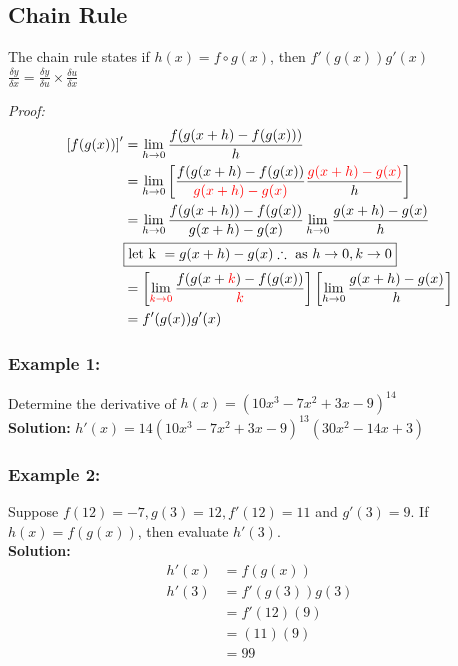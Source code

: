 \documentclass{article}
\begin{document}
\subsection{Chain Rule}
\begin{tcolorbox}[colback=OliveGreen!5!snow, colframe=white!50!white,
  colbacktitle=OliveGreen!75!mistyrose, title=Chain Rule]
The chain rule states 
if $h(x)=f \circ g(x)$, then $f'(g(x))g'(x)$ \\
$\frac{\delta y}{\delta x}=\frac{\delta y}{\delta u} \times \frac{\delta u}{\delta x}$
\end{tcolorbox}
\textit{Proof:}\\
\begin{align*}
\left[f(g(x)) \right]'&=\lim_{h \to 0} \frac{f(g(x+h)-f(g(x)))}{h}\\
&= \lim_{h \to 0} \left[ \frac{f(g(x+h)-f(g(x))}{\textcolor{red}{g(x+h)-g(x)}} \frac{\textcolor{red}{g(x+h)-g(x)}}{h}\right]\\
&=\lim_{h \to 0}\frac{f(g(x+h))-f(g(x))}{g(x+h)-g(x)} \lim_{h \to 0}\frac{g(x+h)-g(x)}{h}\\
&\boxed{\text{let k } = g(x+h)-g(x) \therefore \text{ as } h \to 0, k \to0}\\
&= \left[\lim_{\textcolor{red}{k \to 0}}\frac{f(g(x+\textcolor{red}{k})-f(g(x))}{\textcolor{red}{k}} \right]\left[ \lim_{h \to 0}\frac{g(x+h)-g(x)}{h}\right]\\
&=f'(g(x))g'(x)
\end{align*}
\subsubsection*{Example 1:}
Determine the derivative of $h(x)=(10x^3-7x^2+3x-9)^{14}$\\
\textbf{Solution:}
$h'(x)=14(10x^3-7x^2+3x-9)^{13}(30x^2-14x+3)$
\subsubsection*{Example 2:}
Suppose $f(12)=-7, g(3)=12, f'(12)=11$ and $g'(3)=9$. If $h(x)=f(g(x))$, then evaluate $h'(3)$.\\
\textbf{Solution:}
\begin{align*}
    h'(x)&=f(g(x))\\
    h'(3)&=f'(g(3))g(3)\\
    &=f'(12)(9)\\
    &=(11)(9)\\
    &=99
\end{align*}
\newpage 
\end{document}
